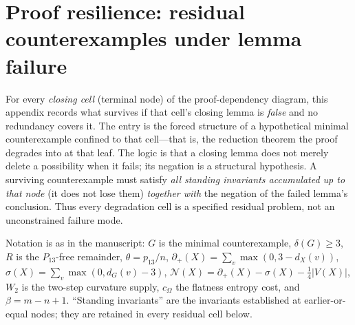\documentclass[11pt]{article}
\newcommand{\defp}{\partial_+}
\newcommand{\No}{\mathcal N}
\begin{document}
\clearpage
\section{Proof resilience: residual counterexamples under lemma failure}\label{app:resilience}

For every \emph{closing cell} (terminal node) of the proof-dependency diagram, this appendix records what survives if that cell's closing lemma is \emph{false} and no redundancy covers it.  The entry is the forced structure of a hypothetical minimal counterexample confined to that cell---that is, the reduction theorem the proof degrades into at that leaf.  The logic is that a closing lemma does not merely delete a possibility when it fails; its negation is a structural hypothesis.  A surviving counterexample must satisfy \emph{all standing invariants accumulated up to that node} (it does not lose them) \emph{together with} the negation of the failed lemma's conclusion.  Thus every degradation cell is a specified residual problem, not an unconstrained failure mode.

Notation is as in the manuscript: $G$ is the minimal counterexample, $\delta(G)\ge3$, $R$ is the $P_{13}$-free remainder, $\theta=p_{13}/n$, $\defp(X)=\sum_v\max(0,3-d_X(v))$, $\sigma(X)=\sum_v\max(0,d_G(v)-3)$, $\No(X)=\defp(X)-\sigma(X)-\tfrac14|V(X)|$, $W_2$ is the two-step curvature supply, $c_\Omega$ the flatness entropy cost, and $\beta=m-n+1$.  ``Standing invariants'' are the invariants established at earlier-or-equal nodes; they are retained in every residual cell below.
\end{document}
